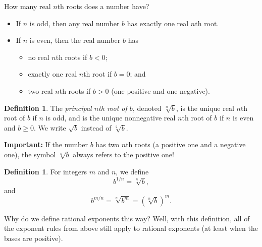 \documentclass[letterpaper,12pt,oneside]{book}
\theoremstyle{definition}
\newtheorem{definition}[theorem]{Definition}
\begin{document}
\noindent
How many real $n$th roots does a number have?  
\begin{itemize}
\item If $n$ is odd, then any real number $b$ has exactly one real $n$th root.
\item If $n$ is even, then the real number $b$ has
\begin{itemize}
\item no real $n$th roots if $b<0$;
\item exactly one real $n$th root if $b=0$; and
\item two real $n$th roots if $b>0$ (one positive and one negative).
\end{itemize}
\end{itemize}

\begin{definition}
The \emph{principal $n$th root of $b$}, denoted $\sqrt[n]{b}$, is the unique real $n$th root of $b$ if $n$ is odd, and is the unique nonnegative real $n$th root of $b$ if $n$ is even and $b\geq 0$.  We write $\sqrt{b}$ instead of $\sqrt[2]{b}$. 

\smallskip

\noindent\textbf{Important:} If the number $b$ has two $n$th roots (a positive one and a negative one), the symbol $\sqrt[n]{b}$ always refers to the positive one!
\end{definition}




\begin{definition}
For integers $m$ and $n$, we define
\[
b^{1/n}=\sqrt[n]{b},
\]
and
\[
b^{m/n}=\sqrt[n]{b^m}=\left(\sqrt[n]{b}\right)^m.
\]
\end{definition}

Why do we define rational exponents this way?  Well, with this definition, all of the exponent rules from above still apply to rational exponents (at least when the bases are positive).

\newpage
\end{document}
